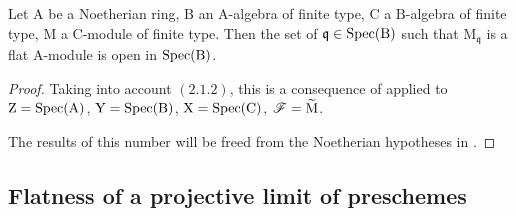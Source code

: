 \begin{corollary}[11.1.6]
\label{IV.11.1.6}
Let $\mathrm{A}$ be a Noetherian ring, $\mathrm{B}$ an $\mathrm{A}$-algebra of finite type, $\mathrm{C}$ a $\mathrm{B}$-algebra of finite type, $\mathrm{M}$ a $\mathrm{C}$-module of finite type. Then the set of $\mathfrak{q}\in\operatorname{Spec}(\mathrm{B})$ such that $\mathrm{M}_\mathfrak{q}$ is a flat $\mathrm{A}$-module is open in $\operatorname{Spec}(\mathrm{B})$.
\end{corollary}

\begin{proof}
Taking into account $(2.1.2)$, this is a consequence of  applied to $\mathrm{Z}=\operatorname{Spec}(\mathrm{A})$, $\mathrm{Y}=\operatorname{Spec}(\mathrm{B})$, $\mathrm{X}=\operatorname{Spec}(\mathrm{C})$, $\mathscr{F}=\widetilde{\mathrm{M}}$.

The results of this number will be freed from the Noetherian hypotheses in .
\end{proof}

\subsection{Flatness of a projective limit of preschemes}
\label{subsection:IV.11.2}


